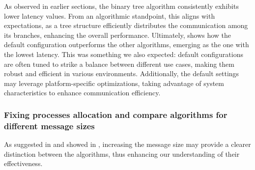 \documentclass{article}
\begin{document}
As observed in earlier sections, the binary tree algorithm consistently exhibits lower latency values. From an algorithmic standpoint, this aligns with expectations, as a tree structure efficiently distributes the communication among its branches, enhancing the overall performance. Ultimately,  shows how the default configuration outperforms the other algorithms, emerging as the one with the lowest latency. This was something we also expected: default configurations are often tuned to strike a balance between different use cases, making them robust and efficient in various environments. Additionally, the default settings may leverage platform-specific optimizations, taking advantage of system characteristics to enhance communication efficiency. 

\subsubsection{Fixing processes allocation and compare algorithms for different message sizes}\label{subsubsection:message_size}

As suggested in  and showed in , increasing the message size may provide a clearer distinction between the algorithms, thus enhancing our understanding of their effectiveness.
\end{document}
